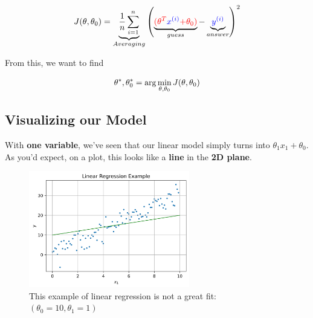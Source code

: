         \begin{equation}
            J(\theta,\theta_0) = 
                        \underbrace{
                            \frac{1}{n}  \sum_{i=1}^n 
                        }_{Averaging}
                        \left( 
                            \underbrace{
                                \textcolor{red}{ (\theta^T} \textcolor{blue}{x^{(i)}} \textcolor{red}{ + \theta_0) } 
                            }_{guess}
                            - \underbrace{
                                \textcolor{blue}{y^{(i)}}
                            }_{answer}
                        \right)^2 
        \end{equation}
        
        From this, we want to find 
        
        \begin{equation*}
            \theta^*, \theta_0^* = {\rm arg}\min_{\theta, \theta_0}{J(\theta,\theta_0)}
        \end{equation*}
        
    \subsection{Visualizing our Model}
    
        With \textbf{one variable}, we've seen that our linear model simply turns into $\theta_1 x_1  + \theta_0$. As you'd expect, on a plot, this looks like a \textbf{line} in the \textbf{2D plane}.
        
        \begin{figure}[H]
        \centering
            \includegraphics[width=70mm,scale=0.5]{images/regression_images/Regression_Example_Poor_Fit.png}
        
            \caption*{This example of linear regression is not a great fit: $(\theta_0=10, \theta_1=1)$}
        \end{figure}
        
